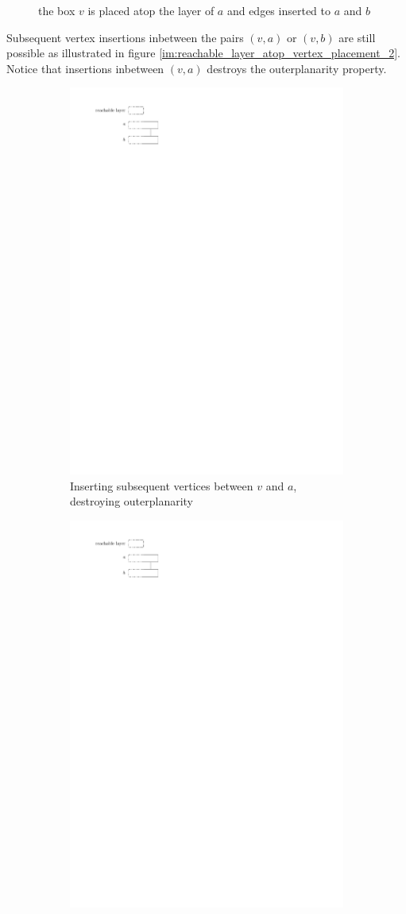 \begin{description}
\begin{figure}[H]
\begin{subfigure}{0.4\textwidth}
\end{subfigure}
		\caption{the box $v$ is placed atop the layer of $a$ and edges inserted to $a$ and $b$}\label{im:reachable_layer_atop_vertex_placement}
	\end{figure}
	Subsequent vertex insertions inbetween the pairs $(v,a)$ or $(v,b)$ are still possible as illustrated in figure \ref{im:reachable_layer_atop_vertex_placement_2}. Notice that insertions inbetween $(v,a)$ destroys the outerplanarity property.
		\begin{figure}[H]
		\centering
		\begin{subfigure}{0.7\textwidth}
			\centering
			\includegraphics[page=3,width=0.6\linewidth]{graphics/maximal_outerplanar_reachable_layers.pdf}
			\caption{Inserting subsequent vertices between $v$ and $a$, destroying outerplanarity}\label{im:reachable_layer_atop_vertex_placement_2a}
		\end{subfigure}
		\begin{subfigure}{0.7\textwidth}
			\centering
			\includegraphics[page=4,width=0.55\linewidth]{graphics/maximal_outerplanar_reachable_layers.pdf}

\end{subfigure}
\end{figure}
\end{description}
